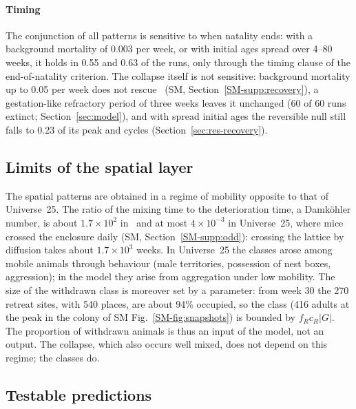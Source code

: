 \paragraph{Timing}
The conjunction of all patterns is sensitive to when natality ends: with a background mortality of 0.003 per week, or
with initial ages spread over 4--80 weeks, it holds in 0.55 and 0.63 of the runs, only through the timing clause of
the end-of-natality criterion. The collapse itself is not sensitive: background mortality up to 0.05 per week does
not rescue \Cone\ (SM, Section~\ref{SM-supp:recovery}), a gestation-like refractory period of three weeks leaves it unchanged
(60 of 60 runs extinct; Section~\ref{sec:model}), and with spread initial ages the reversible null still falls to
0.23 of its peak and cycles (Section~\ref{sec:res-recovery}).

\subsection{Limits of the spatial layer}
\label{sec:spatial-limits}

The spatial patterns are obtained in a regime of mobility opposite to that of Universe~25. The ratio of the mixing
time to the deterioration time, a Damk\"ohler number, is about $1.7\times10^2$ in \Cone\ and at most $4\times10^{-3}$
in Universe~25, where mice crossed the enclosure daily (SM, Section~\ref{SM-supp:odd}): crossing the lattice by
diffusion takes about $1.7\times10^3$ weeks. In Universe~25 the classes arose among mobile animals through behaviour
(male territories, possession of nest boxes, aggression); in the model they arise from aggregation under low
mobility. The size of the withdrawn class is moreover set by a parameter: from week 30 the 270 retreat sites, with
540 places, are about 94\% occupied, so the class (416 adults at the peak in the colony of SM Fig.~\ref{SM-fig:snapshots}) is bounded
by $f_Rc_R|G|$. The proportion of withdrawn animals is thus an input of the model, not an output. The collapse, which
also occurs well mixed, does not depend on this regime; the classes do.

\subsection{Testable predictions}
\label{sec:predictions}

